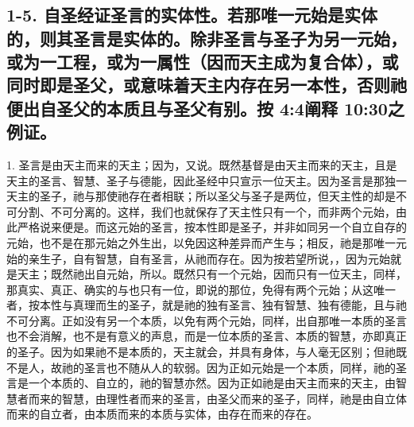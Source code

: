 
\section{}


\subsection{1-5. 自圣经证圣言的实体性。若那唯一元始是实体的，则其圣言是实体的。除非圣言与圣子为另一元始，或为一工程，或为一属性（因而天主成为复合体），或同时即是圣父，或意味着天主内存在另一本性，否则祂便出自圣父的本质且与圣父有别。按 4:4阐释 10:30之例证。}

1. 圣言是由天主而来的天主；因为，又说。既然基督是由天主而来的天主，且是天主的圣言、智慧、圣子与德能，因此圣经中只宣示一位天主。因为圣言是那独一天主的圣子，祂与那使祂存在者相联；所以圣父与圣子是两位，但天主性的却是不可分割、不可分离的。这样，我们也就保存了天主性只有一个，而非两个元始，由此严格说来便是。而这元始的圣言，按本性即是圣子，并非如同另一个自立自存的元始，也不是在那元始之外生出，以免因这种差异而产生与；相反，祂是那唯一元始的亲生子，自有智慧，自有圣言，从祂而存在。因为按若望所说，，因为元始就是天主；既然祂出自元始，所以。既然只有一个元始，因而只有一位天主，同样，那真实、真正、确实的与也只有一位，即说的那位，免得有两个元始；从这唯一者，按本性与真理而生的圣子，就是祂的独有圣言、独有智慧、独有德能，且与祂不可分离。正如没有另一个本质，以免有两个元始，同样，出自那唯一本质的圣言也不会消解，也不是有意义的声息，而是一位本质的圣言、本质的智慧，亦即真正的圣子。因为如果祂不是本质的，天主就会，并具有身体，与人毫无区别；但祂既不是人，故祂的圣言也不随从人的软弱。因为正如元始是一个本质，同样，祂的圣言是一个本质的、自立的，祂的智慧亦然。因为正如祂是由天主而来的天主，由智慧者而来的智慧，由理性者而来的圣言，由圣父而来的圣子，同样，祂是由自立体而来的自立者，由本质而来的本质与实体，由存在而来的存在。\par

